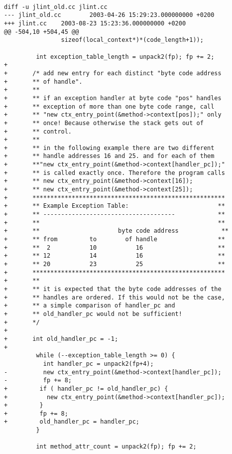 \documentclass[11pt,twoside,a4paper,draft]{article}
\begin{document}
\begin{verbatim}

diff -u jlint_old.cc jlint.cc
--- jlint_old.cc        2003-04-26 15:29:23.000000000 +0200
+++ jlint.cc    2003-08-23 15:23:36.000000000 +0200
@@ -504,10 +504,45 @@
                sizeof(local_context*)*(code_length+1));
 
         int exception_table_length = unpack2(fp); fp += 2;
+
+       /* add new entry for each distinct "byte code address 
+       ** of handle".
+       **
+       ** if an exception handler at byte code "pos" handles
+       ** exception of more than one byte code range, call
+       ** "new ctx_entry_point(&method->context[pos]);" only
+       ** once! Because otherwise the stack gets out of 
+       ** control. 
+       **
+       ** in the following example there are two different
+       ** handle addresses 16 and 25. and for each of them 
+       **"new ctx_entry_point(&method->context[handler_pc]);"
+       ** is called exactly once. Therefore the program calls
+       ** new ctx_entry_point(&method->context[16]);
+       ** new ctx_entry_point(&method->context[25]);
+       ******************************************************
+       ** Example Exception Table:                         **
+       ** -------------------------------------            **
+       **                                                  **
+       **                      byte code address            **
+       ** from         to        of handle                 **
+       **  2           10           16                     **
+       ** 12           14           16                     **
+       ** 20           23           25                     **
+       ******************************************************
+       **
+       ** it is expected that the byte code addresses of the
+       ** handles are ordered. If this would not be the case,
+       ** a simple comparison of handler_pc and 
+       ** old_handler_pc would not be sufficient!
+       */
+
+       int old_handler_pc = -1;
+
         while (--exception_table_length >= 0) { 
           int handler_pc = unpack2(fp+4);
-          new ctx_entry_point(&method->context[handler_pc]); 
-          fp += 8;
+         if ( handler_pc != old_handler_pc) {
+           new ctx_entry_point(&method->context[handler_pc]); 
+         }
+         fp += 8;
+         old_handler_pc = handler_pc;
         }
 
         int method_attr_count = unpack2(fp); fp += 2;

\end{verbatim}
\end{document}
